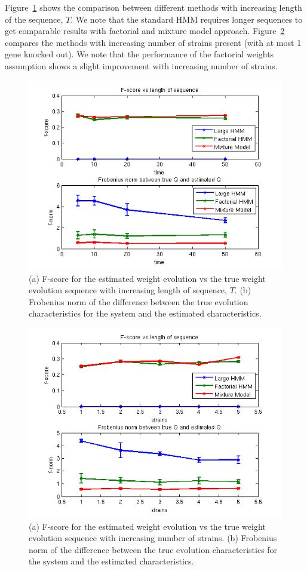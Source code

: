\documentclass{bioinfo}
\begin{document}
Figure~\ref{fig:validation-t} shows the comparison between different
methods with increasing length of the sequence, $T$. We note that the
standard HMM requires longer sequences to get comparable results with
factorial and mixture model approach. Figure~\ref{fig:validation-s} compares the
methods with increasing number of strains present (with at most 1 gene
knocked out). We note that the performance of the factorial weights
assumption shows a slight improvement with increasing number of
strains. 
\begin{figure}[h]
  \centering
  \includegraphics[scale=0.6]{results/mm_tvar}
  \caption{(a) F-score for the estimated weight evolution vs the true
    weight evolution sequence with increasing length of sequence, $T$. (b) Frobenius norm of the difference between the true
    evolution characteristics for the system and the estimated characteristics. }
  \label{fig:validation-t}
\end{figure}

\begin{figure}[h]
  \centering
  \includegraphics[scale=0.6]{results/mm_strain}
  \caption{(a) F-score for the estimated weight evolution vs the true
    weight evolution sequence with increasing number of strains. (b)
    Frobenius norm of the difference between the true evolution
    characteristics for the system and the estimated characteristics. } 
  \label{fig:validation-s}
\end{figure}
\end{document}
